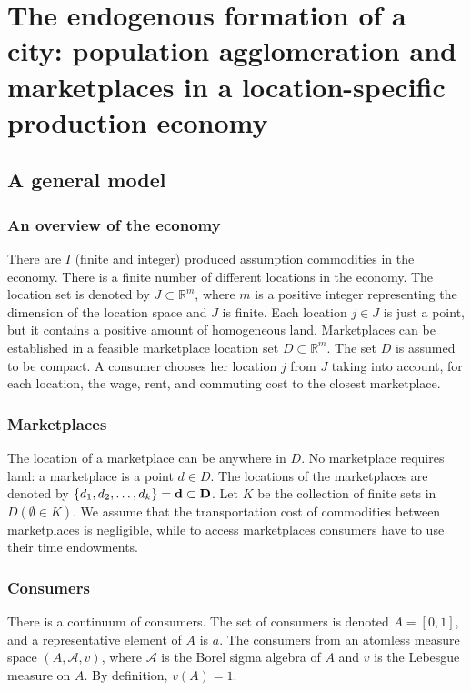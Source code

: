 \chapter{The endogenous formation of a city: population agglomeration and marketplaces in a location-specific production economy}

\section{A general model}

\subsection{An overview of the economy}

There are $I$ (finite and integer) produced assumption commodities in the economy. There is a finite number of different locations in the economy. The location set is denoted by $J \subset \mathbb{R}^m$, where $m$ is a positive integer representing the dimension of the location space and $J$ is finite. Each location $j \in J$ is just a point, but it contains a positive amount of homogeneous land. Marketplaces can be established in a feasible marketplace location set $D \subset \mathbb{R}^m$. The set $D$ is assumed to be compact. A consumer chooses her location $j$ from $J$ taking into account, for each location, the wage, rent, and commuting cost to the closest marketplace.

\subsection{Marketplaces}

The location of a marketplace can be anywhere in $D$. No marketplace requires land: a marketplace is a point $d \in D$. The locations of the marketplaces are denoted by $\{d_1, d_2, \ldots, d_k\} = \bf{d} \subset D$. Let $K$ be the collection of finite sets in $D(\emptyset \in K)$. We assume that the transportation cost of commodities between marketplaces is negligible, while to access marketplaces consumers have to use their time endowments.

\subsection{Consumers}

There is a continuum of consumers. The set of consumers is denoted $A = [0, 1]$, and a representative element of $A$ is $a$. The consumers from an atomless measure space $(A, \mathcal{A}, v)$, where $\mathcal{A}$ is the Borel sigma algebra of $A$ and $v$ is the Lebesgue measure on $A$. By definition, $v(A) = 1$.

